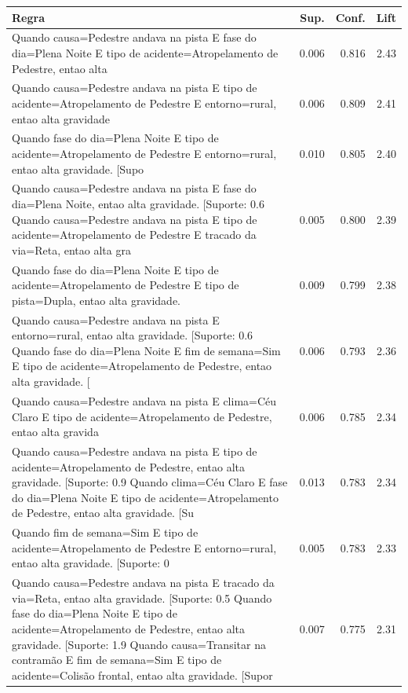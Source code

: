 \begin{tabular}{@{}p{7cm}rrr@{}}
\toprule
Regra & Sup. & Conf. & Lift \\
\midrule
Quando causa=Pedestre andava na pista E fase do dia=Plena Noite E tipo de acidente=Atropelamento de Pedestre, entao alta & 0.006 & 0.816 & 2.43 \\
Quando causa=Pedestre andava na pista E tipo de acidente=Atropelamento de Pedestre E entorno=rural, entao alta gravidade & 0.006 & 0.809 & 2.41 \\
Quando fase do dia=Plena Noite E tipo de acidente=Atropelamento de Pedestre E entorno=rural, entao alta gravidade. [Supo & 0.010 & 0.805 & 2.40 \\
Quando causa=Pedestre andava na pista E fase do dia=Plena Noite, entao alta gravidade. [Suporte: 0.6%
Quando causa=Pedestre andava na pista E tipo de acidente=Atropelamento de Pedestre E tracado da via=Reta, entao alta gra & 0.005 & 0.800 & 2.39 \\
Quando fase do dia=Plena Noite E tipo de acidente=Atropelamento de Pedestre E tipo de pista=Dupla, entao alta gravidade. & 0.009 & 0.799 & 2.38 \\
Quando causa=Pedestre andava na pista E entorno=rural, entao alta gravidade. [Suporte: 0.6%
Quando fase do dia=Plena Noite E fim de semana=Sim E tipo de acidente=Atropelamento de Pedestre, entao alta gravidade. [ & 0.006 & 0.793 & 2.36 \\
Quando causa=Pedestre andava na pista E clima=Céu Claro E tipo de acidente=Atropelamento de Pedestre, entao alta gravida & 0.006 & 0.785 & 2.34 \\
Quando causa=Pedestre andava na pista E tipo de acidente=Atropelamento de Pedestre, entao alta gravidade. [Suporte: 0.9%
Quando clima=Céu Claro E fase do dia=Plena Noite E tipo de acidente=Atropelamento de Pedestre, entao alta gravidade. [Su & 0.013 & 0.783 & 2.34 \\
Quando fim de semana=Sim E tipo de acidente=Atropelamento de Pedestre E entorno=rural, entao alta gravidade. [Suporte: 0 & 0.005 & 0.783 & 2.33 \\
Quando causa=Pedestre andava na pista E tracado da via=Reta, entao alta gravidade. [Suporte: 0.5%
Quando fase do dia=Plena Noite E tipo de acidente=Atropelamento de Pedestre, entao alta gravidade. [Suporte: 1.9%
Quando causa=Transitar na contramão E fim de semana=Sim E tipo de acidente=Colisão frontal, entao alta gravidade. [Supor & 0.007 & 0.775 & 2.31 \\
\bottomrule
\end{tabular}